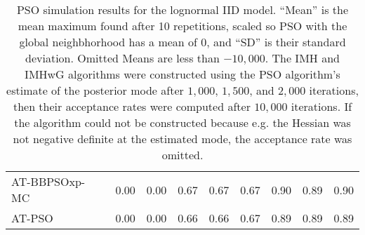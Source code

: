\documentclass[12pt]{article}
\begin{document}
\begin{table}[h]
{\begin{tabular}{llrr|rrr|rrr}
  AT-BBPSOxp-MC &  & 0.00 & 0.00 & 0.67 & 0.67 & 0.67 & 0.90 & 0.89 & 0.90 \\ 
  AT-PSO &  & 0.00 & 0.00 & 0.66 & 0.66 & 0.67 & 0.89 & 0.89 & 0.89 \\ 
   \hline
\end{tabular}
}
\label{tab:psolnormiid}
\caption{PSO simulation results for the lognormal IID model. ``Mean'' is the mean maximum found after 10 repetitions, scaled so PSO with the global neighbhorhood has a mean of 0, and ``SD'' is their standard deviation. Omitted Means are less than $-10,000$. The IMH and IMHwG algorithms were constructed using the PSO algorithm's estimate of the posterior mode after $1,000$, $1,500$, and $2,000$ iterations, then their acceptance rates were computed after $10,000$ iterations. If the algorithm could not be constructed because e.g. the Hessian was not negative definite at the estimated mode, the acceptance rate was omitted.}
\end{table}
\end{document}
